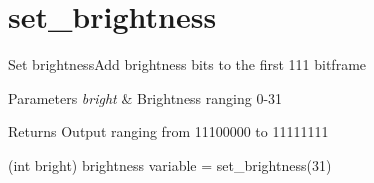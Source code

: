 \hypertarget{set_brightness-example}{\section{set\-\_\-brightness}
}
Set brightness\-Add brightness bits to the first 111 bitframe


\begin{DoxyParams}{Parameters}
{\em bright} & Brightness ranging 0-\/31 \\
\hline
\end{DoxyParams}
\begin{DoxyReturn}{Returns}
Output ranging from 11100000 to 11111111
\end{DoxyReturn}
(int bright) brightness variable = set\-\_\-brightness(31)


\begin{DoxyCodeInclude}
\end{DoxyCodeInclude}
 